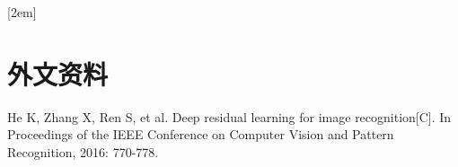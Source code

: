 
[2em]{\vspace{.5\baselineskip}\xiaosan\song}
             {\prechaptername\zhnumber{\thecontentslabel}\postchaptername\qquad}{}
             {}             %
\chapter*{外文资料}
\lhead{}
\rhead{}
\chead{}
\lfoot{}
\cfoot{}
\rfoot{}

\noindent
{He K, Zhang X, Ren S, et al. Deep residual learning for image recognition[C]. In Proceedings of the IEEE Conference on Computer Vision and Pattern Recognition, 2016: 770-778.}

\thispagestyle{empty}
\newpage




